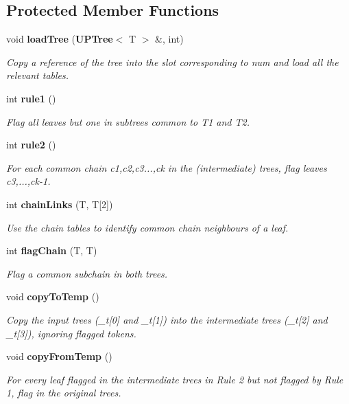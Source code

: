 \subsection*{Protected Member Functions}
\begin{CompactItemize}
\item 
void {\bf load\-Tree} ({\bf UPTree}$<$ T $>$ \&, int)
\begin{CompactList}\small\item\em Copy a reference of the tree into the slot corresponding to num and load all the relevant tables. \item\end{CompactList}\item 
int {\bf rule1} ()
\begin{CompactList}\small\item\em Flag all leaves but one in subtrees common to T1 and T2. \item\end{CompactList}\item 
int {\bf rule2} ()
\begin{CompactList}\small\item\em For each common chain c1,c2,c3...,ck in the (intermediate) trees, flag leaves c3,...,ck-1. \item\end{CompactList}\item 
int {\bf chain\-Links} (T, T[2])
\begin{CompactList}\small\item\em Use the chain tables to identify common chain neighbours of a leaf. \item\end{CompactList}\item 
int {\bf flag\-Chain} (T, T)
\begin{CompactList}\small\item\em Flag a common subchain in both trees. \item\end{CompactList}\item 
void {\bf copy\-To\-Temp} ()
\begin{CompactList}\small\item\em Copy the input trees (\_\-t[0] and \_\-t[1]) into the intermediate trees (\_\-t[2] and \_\-t[3]), ignoring flagged tokens. \item\end{CompactList}\item 
void {\bf copy\-From\-Temp} ()
\begin{CompactList}\small\item\em For every leaf flagged in the intermediate trees in Rule 2 but not flagged by Rule 1, flag in the original trees. \item\end{CompactList}\end{CompactItemize}
